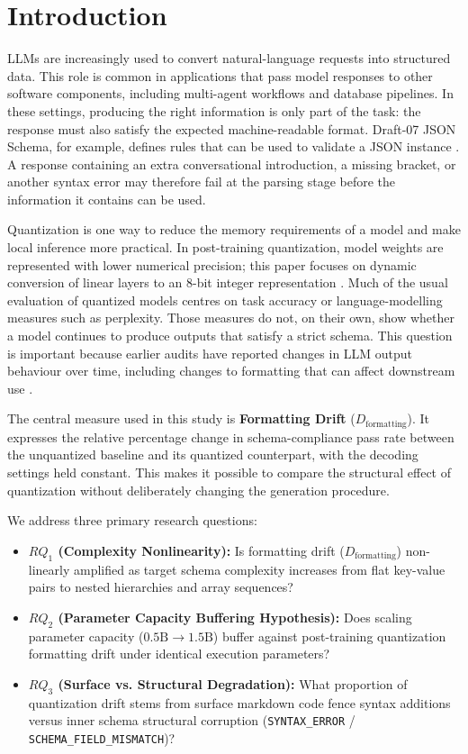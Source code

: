 \documentclass[10pt, conference, a4paper]{IEEEtran}
\begin{document}
\section{Introduction}
LLMs are increasingly used to convert natural-language requests into structured data. This role is common in applications that pass model responses to other software components, including multi-agent workflows and database pipelines. In these settings, producing the right information is only part of the task: the response must also satisfy the expected machine-readable format. Draft-07 JSON Schema, for example, defines rules that can be used to validate a JSON instance \cite{jsonschema}. A response containing an extra conversational introduction, a missing bracket, or another syntax error may therefore fail at the parsing stage before the information it contains can be used.

Quantization is one way to reduce the memory requirements of a model and make local inference more practical. In post-training quantization, model weights are represented with lower numerical precision; this paper focuses on dynamic conversion of linear layers to an 8-bit integer representation \cite{pytorch_quant,smoothquant}. Much of the usual evaluation of quantized models centres on task accuracy or language-modelling measures such as perplexity. Those measures do not, on their own, show whether a model continues to produce outputs that satisfy a strict schema. This question is important because earlier audits have reported changes in LLM output behaviour over time, including changes to formatting that can affect downstream use \cite{chen2023,chen2024}.

The central measure used in this study is \textbf{Formatting Drift} ($D_{\text{formatting}}$). It expresses the relative percentage change in schema-compliance pass rate between the unquantized baseline and its quantized counterpart, with the decoding settings held constant. This makes it possible to compare the structural effect of quantization without deliberately changing the generation procedure.

We address three primary research questions:
\begin{itemize}
    \item \textbf{$RQ_1$ (Complexity Nonlinearity):} Is formatting drift ($D_{\text{formatting}}$) non-linearly amplified as target schema complexity increases from flat key-value pairs to nested hierarchies and array sequences?
    \item \textbf{$RQ_2$ (Parameter Capacity Buffering Hypothesis):} Does scaling parameter capacity ($0.5\text{B} \rightarrow 1.5\text{B}$) buffer against post-training quantization formatting drift under identical execution parameters?
    \item \textbf{$RQ_3$ (Surface vs. Structural Degradation):} What proportion of quantization drift stems from surface markdown code fence syntax additions versus inner schema structural corruption (\texttt{SYNTAX\_ERROR} / \texttt{SCHEMA\_FIELD\_MISMATCH})?
\end{itemize}
\end{document}
